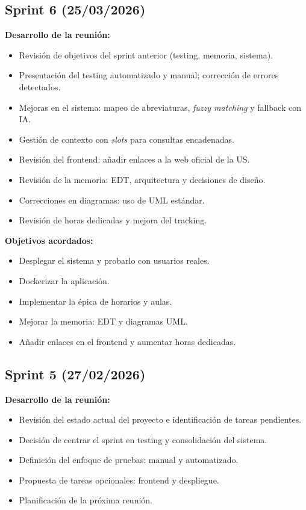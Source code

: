 \subsection*{Sprint 6 (25/03/2026)}

\textbf{Desarrollo de la reunión:}
\begin{itemize}
  \item Revisión de objetivos del sprint anterior (testing, memoria, sistema).
  \item Presentación del testing automatizado y manual; corrección de errores detectados.
  \item Mejoras en el sistema: mapeo de abreviaturas, \textit{fuzzy matching} y fallback con IA.
  \item Gestión de contexto con \textit{slots} para consultas encadenadas.
  \item Revisión del frontend: añadir enlaces a la web oficial de la US.
  \item Revisión de la memoria: EDT, arquitectura y decisiones de diseño.
  \item Correcciones en diagramas: uso de UML estándar.
  \item Revisión de horas dedicadas y mejora del tracking.
\end{itemize}

\textbf{Objetivos acordados:}
\begin{itemize}
  \item Desplegar el sistema y probarlo con usuarios reales.
  \item Dockerizar la aplicación.
  \item Implementar la épica de horarios y aulas.
  \item Mejorar la memoria: EDT y diagramas UML.
  \item Añadir enlaces en el frontend y aumentar horas dedicadas.
\end{itemize}

\subsection*{Sprint 5 (27/02/2026)}

\textbf{Desarrollo de la reunión:}
\begin{itemize}
  \item Revisión del estado actual del proyecto e identificación de tareas pendientes.
  \item Decisión de centrar el sprint en testing y consolidación del sistema.
  \item Definición del enfoque de pruebas: manual y automatizado.
  \item Propuesta de tareas opcionales: frontend y despliegue.
  \item Planificación de la próxima reunión.
\end{itemize}

